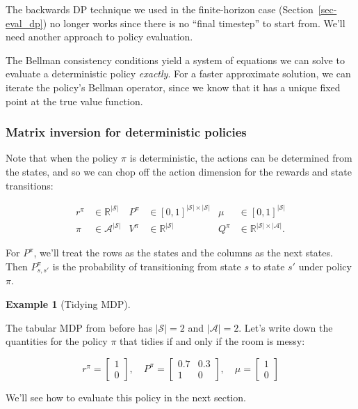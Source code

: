 \documentclass[
  letterpaper,
  DIV=11,
  numbers=noendperiod]{scrreprt}
\theoremstyle{plain}
\theoremstyle{plain}
\theoremstyle{definition}
\newtheorem{example}{Example}[chapter]
\theoremstyle{definition}
\theoremstyle{remark}
\begin{document}
The backwards DP technique we used in the finite-horizon case
(Section~\ref{sec-eval_dp}) no longer works since there is no ``final
timestep'' to start from. We'll need another approach to policy
evaluation.

The Bellman consistency conditions yield a system of equations we can
solve to evaluate a deterministic policy \emph{exactly}. For a faster
approximate solution, we can iterate the policy's Bellman operator,
since we know that it has a unique fixed point at the true value
function.

\subsubsection{Matrix inversion for deterministic
policies}\label{matrix-inversion-for-deterministic-policies}

Note that when the policy \(\pi\) is deterministic, the actions can be
determined from the states, and so we can chop off the action dimension
for the rewards and state transitions:

\[
\begin{aligned}
    r^{\pi} &\in \mathbb{R}^{|\mathcal{S}|} & P^{\pi} &\in [0, 1]^{|\mathcal{S}| \times |\mathcal{S}|} & \mu &\in [0, 1]^{|\mathcal{S}|} \\
    \pi &\in \mathcal{A}^{|\mathcal{S}|} & V^\pi &\in \mathbb{R}^{|\mathcal{S}|} & Q^\pi &\in \mathbb{R}^{|\mathcal{S}| \times |\mathcal{A}|}.
\end{aligned}
\]

For \(P^\pi\), we'll treat the rows as the states and the columns as the
next states. Then \(P^\pi_{s, s'}\) is the probability of transitioning
from state \(s\) to state \(s'\) under policy \(\pi\).

\begin{example}[Tidying
MDP]\protect\hypertarget{exm-tidy_tabular}{}\label{exm-tidy_tabular}

The tabular MDP from before has \(|\mathcal{S}| = 2\) and
\(|\mathcal{A}| = 2\). Let's write down the quantities for the policy
\(\pi\) that tidies if and only if the room is messy:

\[r^{\pi} = \begin{bmatrix} 1 \\ 0 \end{bmatrix}, \quad
        P^{\pi} = \begin{bmatrix} 0.7 & 0.3 \\ 1 & 0 \end{bmatrix}, \quad
        \mu = \begin{bmatrix} 1 \\ 0 \end{bmatrix}\]

We'll see how to evaluate this policy in the next section.

\end{example}
\end{document}
